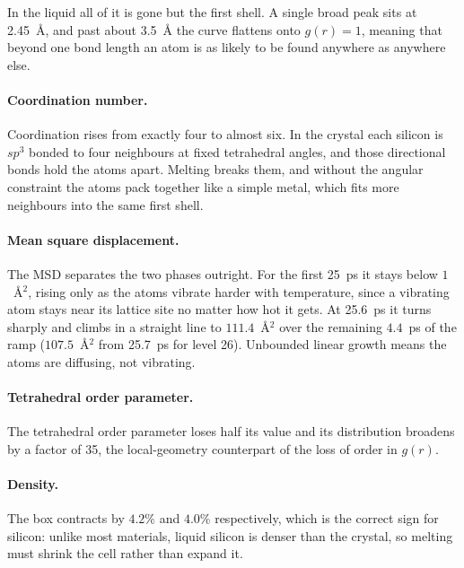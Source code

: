 \documentclass{article}
\begin{document}
In the liquid all of it is gone but the first shell. A single broad peak sits at 2.45~\AA, and past about 3.5~\AA{} the curve flattens onto $g(r) = 1$, meaning that beyond one bond length an atom is as likely to be found anywhere as anywhere else.

\paragraph{Coordination number.}
Coordination rises from exactly four to almost six. In the crystal each silicon is $sp^3$ bonded to four neighbours at fixed tetrahedral angles, and those directional bonds hold the atoms apart. Melting breaks them, and without the angular constraint the atoms pack together like a simple metal, which fits more neighbours into the same first shell.

\paragraph{Mean square displacement.}
The MSD separates the two phases outright. For the first 25~ps it stays below $1$~\AA$^2$, rising only as the atoms vibrate harder with temperature, since a vibrating atom stays near its lattice site no matter how hot it gets. At 25.6~ps it turns sharply and climbs in a straight line to $111.4$~\AA$^2$ over the remaining $4.4$~ps of the ramp ($107.5$~\AA$^2$ from 25.7~ps for level 26). Unbounded linear growth means the atoms are diffusing, not vibrating.

\paragraph{Tetrahedral order parameter.}
The tetrahedral order parameter loses half its value and its distribution broadens by a factor of 35, the local-geometry counterpart of the loss of order in $g(r)$.

\paragraph{Density.}
The box contracts by $4.2\%$ and $4.0\%$ respectively, which is the correct sign for silicon: unlike most materials, liquid silicon is denser than the crystal, so melting must shrink the cell rather than expand it.
\end{document}
